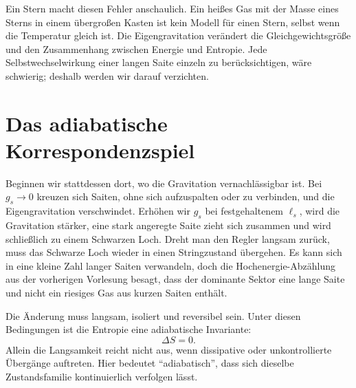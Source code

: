 Ein Stern macht diesen Fehler anschaulich. Ein heißes Gas mit der Masse eines Sterns in einem übergroßen Kasten ist kein Modell für einen Stern, selbst wenn die Temperatur gleich ist. Die Eigengravitation verändert die Gleichgewichtsgröße und den Zusammenhang zwischen Energie und Entropie. Jede Selbstwechselwirkung einer langen Saite einzeln zu berücksichtigen, wäre schwierig; deshalb werden wir darauf verzichten.

\begin{classroomqa}
\end{classroomqa}

\section{Das adiabatische Korrespondenzspiel}

Beginnen wir stattdessen dort, wo die Gravitation vernachlässigbar ist. Bei \(g_s\to0\) kreuzen sich Saiten, ohne sich aufzuspalten oder zu verbinden, und die Eigengravitation verschwindet. Erhöhen wir \(g_s\) bei festgehaltenem \(\ell_s\), wird die Gravitation stärker, eine stark angeregte Saite zieht sich zusammen und wird schließlich zu einem Schwarzen Loch. Dreht man den Regler langsam zurück, muss das Schwarze Loch wieder in einen Stringzustand übergehen. Es kann sich in eine kleine Zahl langer Saiten verwandeln, doch die Hochenergie-Abzählung aus der vorherigen Vorlesung besagt, dass der dominante Sektor eine lange Saite und nicht ein riesiges Gas aus kurzen Saiten enthält.

\begin{classroomqa}
\end{classroomqa}

Die Änderung muss langsam, isoliert und reversibel sein. Unter diesen Bedingungen ist die Entropie eine adiabatische Invariante:
\begin{equation}
\Delta S=0.
\label{eq:l07-adiabatic}
\end{equation}
Allein die Langsamkeit reicht nicht aus, wenn dissipative oder unkontrollierte Übergänge auftreten. Hier bedeutet ``adiabatisch'', dass sich dieselbe Zustandsfamilie kontinuierlich verfolgen lässt.

